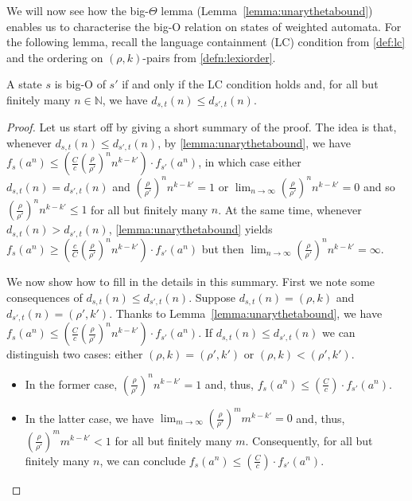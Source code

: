 \documentclass[10pt,a4paper]{amsart}
\numberwithin{equation}{section}
\theoremstyle{plain}
\theoremstyle{definition}
\theoremstyle{remark}
\newcommand\dgf{d}
\renewcommand\nu{f}
\begin{document}
We will now see how the big-$\Theta$ lemma (Lemma~\ref{lemma:unarythetabound})
enables us to characterise the big-O relation on states of weighted automata.
For the following lemma, recall the language containment (LC) condition from \cref{def:lc} and the ordering on $(\rho,k)$-pairs from \cref{defn:lexiorder}.

\begin{lem} \label{lem:boundedff}
A state $s$ is big-O of $s'$ if and only if the LC condition holds and, for all but finitely many $n \in \mathbb{N}$, we have $\dgf_{s,t}(n) \le \dgf_{s',t}(n)$.
\end{lem}

\begin{proof}
Let us start off by giving a short summary of the proof.
The idea is that, whenever $\dgf_{s,t}(n) \le \dgf_{s',t}(n)$, by \cref{lemma:unarythetabound},
we have $\nu_s(a^n) \le (\frac{C}{c}(\frac{\rho}{\rho'})^n n^{k-k'})\cdot\nu_{s'}(a^n) $, in which case either $\dgf_{s,t}(n) = \dgf_{s',t}(n)$ and $(\frac{\rho}{\rho'})^n n^{k-k'} =  1$ or $\lim_{n\to\infty}(\frac{\rho}{\rho'})^n n^{k-k'} = 0$ and so $(\frac{\rho}{\rho'})^n n^{k-k'} \le 1$ for all but finitely many $n$.
At the same time, whenever $\dgf_{s,t}(n) > \dgf_{s',t}(n)$, \cref{lemma:unarythetabound} yields $\nu_s(a^n) \ge (\frac{c}{C}(\frac{\rho}{\rho'})^n n^{k-k'})\cdot\nu_{s'}(a^n)$ but then $\lim_{n\to\infty}(\frac{\rho}{\rho'})^n n^{k-k'}= \infty$.

We now show how to fill in the details in this summary.
First we note some consequences of $\dgf_{s,t}(n) \le \dgf_{s',t}(n)$.
Suppose  $\dgf_{s,t}(n) = (\rho,k)$ and $\dgf_{s',t}(n) = (\rho',k')$. Thanks to Lemma~\ref{lemma:unarythetabound},
we have $\nu_s(a^n) \le (\frac{C}{c}(\frac{\rho}{\rho'})^n n^{k-k'})\cdot\nu_{s'}(a^n) $.
If $\dgf_{s,t}(n) \le \dgf_{s',t}(n)$ we can distinguish two cases: either  $(\rho,k)= (\rho',k')$ or $(\rho,k)<(\rho',k')$.
\begin{itemize}
\item In the former case, $(\frac{\rho}{\rho'})^n n^{k-k'} = 1$ and, thus,  ${\nu_s(a^n)} \le (\frac{C}{c})\cdot {\nu_{s'}(a^n)}$.
\item In the latter case, we have $\lim_{m\to\infty} (\frac{\rho}{\rho'})^m m^{k-k'}=0$ and, thus, $(\frac{\rho}{\rho'})^m m^{k-k'} < 1$ for
all but finitely many  $m$. Consequently, for all but finitely many $n$, we can conclude ${\nu_s(a^n)} \le (\frac{C}{c})\cdot {\nu_{s'}(a^n)}$.
\end{itemize}


\end{proof}
\end{document}
